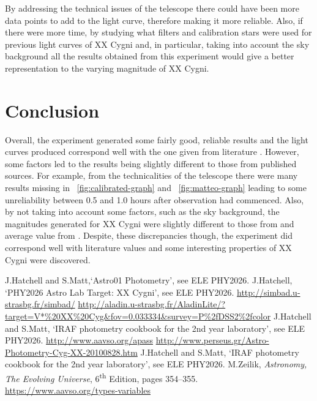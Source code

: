 \documentclass{article}
\newcommand{\figref}[2][\figurename~]{#1\ref{#2}}
\begin{document}
\vspace{2mm}
\noindent
By addressing the technical issues of the telescope there could have been more data points to add to the light curve, therefore making it more reliable. Also, if there were more time, by studying what filters and calibration stars were used for previous light curves of XX Cygni and, in particular, taking into account the sky background all the results obtained from this experiment would give a better representation to the varying magnitude of XX Cygni.

\section{Conclusion}
\label{sec:conclusion}

Overall, the experiment generated some fairly good, reliable results and the light curves produced correspond well with the one given from literature \cite{Web04}. However, some factors led to the results being slightly different to those from published sources. For example, from the technicalities of the telescope there were many results missing in \figref{fig:calibrated-graph} and \figref{fig:matteo-graph} leading to some unreliability between 0.5 and 1.0 hours after observation had commenced. Also, by not taking into account some factors, such as the sky background, the magnitudes generated for XX Cygni were slightly different to those from \cite{Web04} and average value from \cite{Web03}. Despite, these discrepancies though, the experiment did correspond well with literature values and some interesting properties of XX Cygni were discovered.

\begin{thebibliography}{9}
 J.Hatchell and S.Matt,`Astro01 Photometry', see ELE PHY2026.
 J.Hatchell, `PHY2026 Astro Lab Target: XX Cygni', see ELE PHY2026. 
 \url{http://simbad.u-strasbg.fr/simbad/}
 \url{http://aladin.u-strasbg.fr/AladinLite/?target=V*%20XX%20Cyg&fov=0.033334&survey=P%2fDSS2%2fcolor}
 J.Hatchell and S.Matt, `IRAF photometry cookbook for the 2nd year laboratory', see ELE PHY2026.
 \url{http://www.aavso.org/apass}
 \url{http://www.perseus.gr/Astro-Photometry-Cyg-XX-20100828.htm}
 J.Hatchell and S.Matt, `IRAF photometry cookbook for the 2nd year laboratory', see ELE PHY2026.
 M.Zeilik, \textit{Astronomy, The Evolving Universe}, 6\textsuperscript{th} Edition, pages 354--355.
 \url{https://www.aavso.org/types-variables} 

\end{thebibliography}
\end{document}
